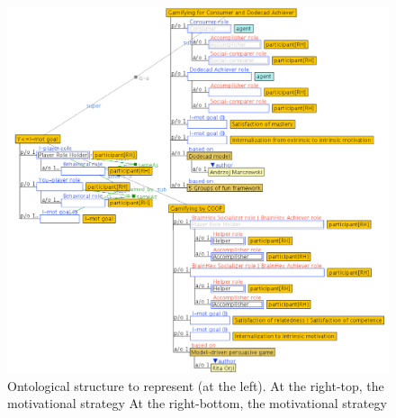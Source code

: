 \begin{figure}[htb]
 \caption[Ontological structure to represent Individual motivational strategy]{Ontological structure to represent  (at the left). At the right-top, the motivational strategy  At the right-bottom, the motivational strategy }
 \label{fig:ontological-structure-individual-motivational-strategy}
 \centering
 \includegraphics[width=1\textwidth]{images/chap-ontogacles1/ontological-structure-individual-motivational-strategy.png}
 \fautor
\end{figure}

